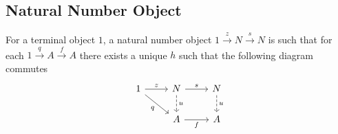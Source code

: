 \subsection{Natural Number Object}
For a terminal object $1$, a natural number object
$1\overset{z}{\to}N\overset{s}{\to}N$ is such that for each
$1\overset{q}{\to}A\overset{f}{\to}A$ there exists a unique $h$ such that the
following diagram commutes \parencite{awodey:category_theory}
\[\begin{tikzcd}
	1 & N & N \\
	& A & A
	\arrow["z", from=1-1, to=1-2]
	\arrow["q"', from=1-1, to=2-2]
	\arrow["s", from=1-2, to=1-3]
	\arrow["f"', from=2-2, to=2-3]
	\arrow["u", dashed, from=1-2, to=2-2]
	\arrow["u", dashed, from=1-3, to=2-3]
\end{tikzcd}\]